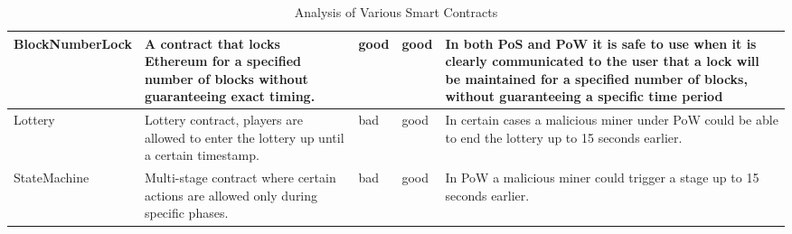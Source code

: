 \begin{table}[H]
\begin{tabularx}{\textwidth}{L{3.5cm}L{3.5cm}C{0.5cm}C{0.5cm}X}
    BlockNumberLock        & A contract that locks Ethereum for a specified number of blocks without guaranteeing exact timing.                                      & good         & good         & In both PoS and PoW it is safe to use when it is clearly communicated to the user that a lock will be maintained for a specified number of blocks, without guaranteeing a specific time period \\ \hline
    Lottery                & Lottery contract, players are allowed to enter the lottery up until a certain timestamp.                                                & bad          & good         & In certain cases a malicious miner under PoW could be able to end the lottery up to 15 seconds earlier.                                                                                       \\ \hline                  
    StateMachine           & Multi-stage contract where certain actions are allowed only during specific phases.                                                     & bad          & good         & In PoW a malicious miner could trigger a stage up to 15 seconds earlier.                                                                                                                     \\ \hline
  \end{tabularx}
  \caption{Analysis of Various Smart Contracts}
  \label{tab:smart_contracts}
\end{table}
%
%
%
